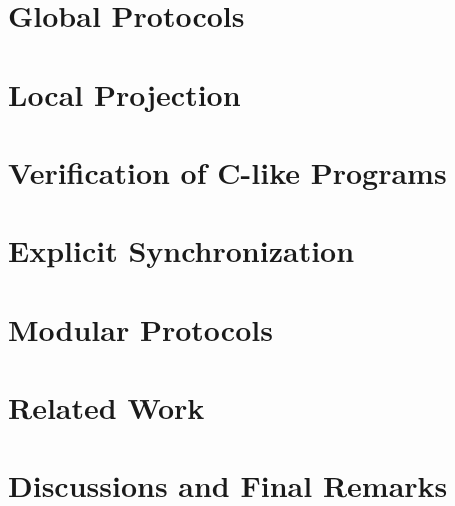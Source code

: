 \documentclass[acmsmall,10pt,review,anonymous]{acmart}\settopmatter{printfolios=true}
\begin{document}
\section{Global Protocols}
\label{sec:global}



\section{Local Projection} 
\label{sec:projection}

 
 \section{Verification of C-like Programs}

 
\section{Explicit Synchronization}


\section{Modular Protocols}


% 

\section{Related Work}


\section{Discussions and Final Remarks}


%
%
%
\end{document}
